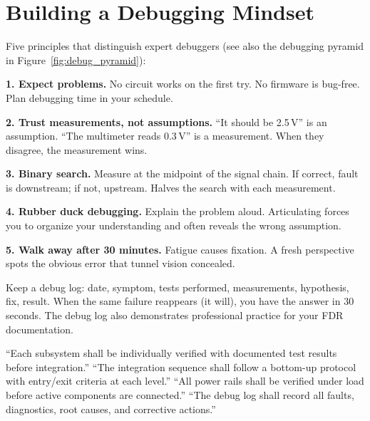 \section{Building a Debugging Mindset}

Five principles that distinguish expert debuggers (see also the debugging pyramid in Figure~\ref{fig:debug_pyramid}):

\textbf{1. Expect problems.} No circuit works on the first try. No firmware is bug-free. Plan debugging time in your schedule.

\textbf{2. Trust measurements, not assumptions.} ``It should be 2.5\,V'' is an assumption. ``The multimeter reads 0.3\,V'' is a measurement. When they disagree, the measurement wins.

\textbf{3. Binary search.} Measure at the midpoint of the signal chain. If correct, fault is downstream; if not, upstream. Halves the search with each measurement.

\textbf{4. Rubber duck debugging.} Explain the problem aloud. Articulating forces you to organize your understanding and often reveals the wrong assumption.

\textbf{5. Walk away after 30 minutes.} Fatigue causes fixation. A fresh perspective spots the obvious error that tunnel vision concealed.

\begin{warningbox}
Keep a debug log: date, symptom, tests performed, measurements, hypothesis, fix, result. When the same failure reappears (it will), you have the answer in 30 seconds. The debug log also demonstrates professional practice for your FDR documentation.
\end{warningbox}

\begin{keyconceptbox}
``Each subsystem shall be individually verified with documented test results before integration.'' ``The integration sequence shall follow a bottom-up protocol with entry/exit criteria at each level.'' ``All power rails shall be verified under load before active components are connected.'' ``The debug log shall record all faults, diagnostics, root causes, and corrective actions.''
\end{keyconceptbox}

